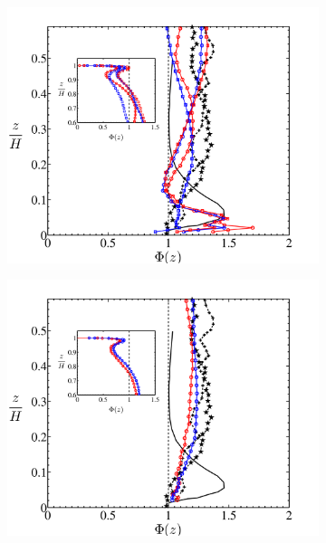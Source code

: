 \begin{figure}
        \centering
        \begin{subfigure}[t]{0.5\textwidth}
                \includegraphics[width=\linewidth]{Fig2/gradient_filt_lotw.pdf}
                \caption{}
                \label{fig:grad1}
        \end{subfigure}%
        \centering
        \begin{subfigure}[t]{0.5\textwidth}
                \includegraphics[width=\linewidth]{Fig2/gradient_filt_lotw2.pdf}
                \caption{}
                \label{fig:grad2}

\end{subfigure}
\end{figure}
